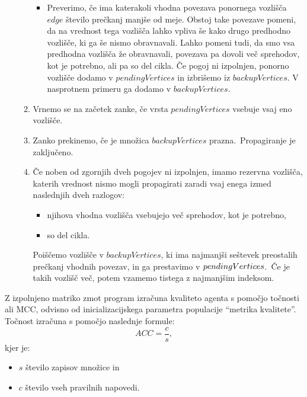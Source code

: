 \documentclass[a4paper,12pt,openright]{book}
\begin{document}
\begin{enumerate}
\begin{enumerate}
\begin{itemize}
                \item Preverimo, če ima katerakoli vhodna povezava ponornega vozlišča $edge$ število prečkanj manjše od meje.
                Obstoj take povezave pomeni, da na vrednost tega vozlišča lahko vpliva še kako drugo predhodno vozlišče, ki ga
                še nismo obravnavali.
                Lahko pomeni tudi, da smo vsa predhodna vozlišča že obravnavali, povezava pa dovoli več sprehodov, kot je potrebno, ali pa so del cikla.
                Če pogoj ni izpolnjen, ponorno vozlišče dodamo v $pendingVertices$ in izbrišemo iz $backupVertices$.
                V nasprotnem primeru ga dodamo v $backupVertices$.
            \end{itemize}
            \item Vrnemo se na začetek zanke, če vrsta $pendingVertices$ vsebuje vsaj eno vozlišče.
            \item Zanko prekinemo, če je množica $backupVertices$ prazna.\ Propagiranje je zaključeno.
            \item Če noben od zgornjih dveh pogojev ni izpolnjen, imamo rezervna vozlišča,
            katerih vrednost nismo mogli propagirati zaradi vsaj enega izmed naslednjih dveh razlogov:
            \begin{itemize}
                \item njihova vhodna vozlišča vsebujejo več sprehodov, kot je potrebno,
                \item so del cikla.
            \end{itemize}
            Poiščemo vozlišče v $backupVertices$, ki ima najmanjši seštevek preostalih prečkanj vhodnih povezav, in ga prestavimo
            v $pending\-Vertices$.\ Če je takih vozlišč več, potem vzamemo tistega z najmanjšim indeksom.
        \end{enumerate}
    \end{enumerate}

    Z izpolnjeno matriko zmot program izračuna kvaliteto agenta s pomočjo točnosti ali MCC, odvisno od inicializacijskega parametra populacije \enquote{metrika kvalitete}.
    Točnost izračuna s pomočjo naslednje formule:
    \begin{equation}
        ACC=\frac{c}{s},
        \label{eq:tocnost}
    \end{equation}
    kjer je:
    \begin{itemize}
        \item $s$ število zapisov množice in
        \item $c$ število vseh pravilnih napovedi.
    \end{itemize}
\end{document}
